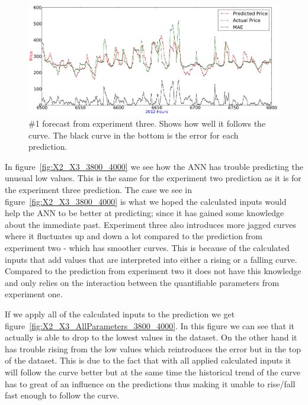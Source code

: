 \begin{figure}[H]
\centering
\includegraphics[width=\linewidth]{billeder/PriceExperimentalAnalysis/X3_Nr1_Best_skew_historical.png}
\caption{\#1 forecast from experiment three. Shows how well it follows the curve. The black curve in the bottom is the error for each prediction.}
\label{fig:X3_Best_With_MAE}
\end{figure}

In figure~\ref{fig:X2_X3_3800_4000} we see how the ANN has trouble predicting the unusual low values. This is the same for the experiment two prediction as it is for the experiment three prediction. The case we see in figure~\ref{fig:X2_X3_3800_4000} is what we hoped the calculated inputs would help the ANN to be better at predicting; since it has gained some knowledge about the immediate past. Experiment three also introduces more jagged curves where it fluctuates up and down a lot compared to the prediction from experiment two - which has smoother curves. This is because of the calculated inputs that add values that are interpreted into either a rising or a falling curve. Compared to the prediction from experiment two it does not have this knowledge and only relies on the interaction between the quantifiable parameters from experiment one.

If we apply all of the calculated inputs to the prediction we get figure~\ref{fig:X2_X3_AllParameters_3800_4000}. In this figure we can see that it actually is able to drop to the lowest values in the dataset. On the other hand it has trouble rising from the low values which reintroduces the error but in the top of the dataset. This is due to the fact that with all applied calculated inputs it will follow the curve better but at the same time the historical trend of the curve has to great of an influence on the predictions thus making it unable to rise/fall fast enough to follow the curve.

